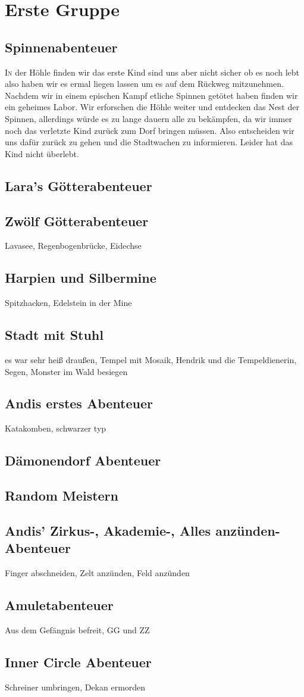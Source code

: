 \chapter{Erste Gruppe}
\section{Spinnenabenteuer}
\lettrine{I}{n} der H\"ohle finden wir das erste Kind sind uns aber nicht sicher ob es noch lebt also haben wir es ermal liegen lassen um es auf dem R\"uckweg mitzunehmen. Nachdem wir in einem epischen Kampf etliche Spinnen get\"otet haben finden wir ein geheimes Labor. Wir erforschen die H\"ohle weiter und entdecken das Nest der Spinnen, allerdings w\"urde es zu lange dauern alle zu bek\"ampfen, da wir immer noch das verletzte Kind zur\"uck zum Dorf bringen m\"ussen. Also entscheiden wir uns daf\"ur zur\"uck zu gehen und die Stadtwachen zu informieren. Leider hat das Kind nicht \"uberlebt.

\section{Lara's G\"otterabenteuer}
\section{Zw\"olf G\"otterabenteuer}
Lavasee, Regenbogenbr\"ucke, Eidechse
\section{Harpien und Silbermine}
Spitzhacken, Edelstein in der Mine
\section{Stadt mit Stuhl}
es war sehr heiß draußen, Tempel mit Mosaik, Hendrik und die Tempeldienerin, Segen, Monster im Wald besiegen
\section{Andis erstes Abenteuer}
Katakomben, schwarzer typ
\section{D\"amonendorf Abenteuer}
\section{Random Meistern}
\section{Andis' Zirkus-, Akademie-, Alles anz\"unden-Abenteuer}
Finger abschneiden, Zelt anzünden, Feld anzünden
\section{Amuletabenteuer}
Aus dem Gef\"angnis befreit, GG und ZZ
\section{Inner Circle Abenteuer}
Schreiner umbringen, Dekan ermorden